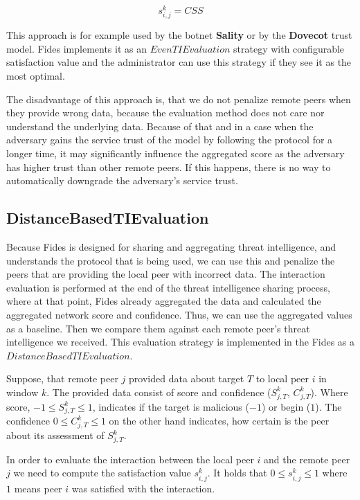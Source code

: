 \begin{equation}
s^{k}_{i, j} = CSS
\end{equation}

This approach is for example used by the botnet \textbf{Sality} or by the \textbf{Dovecot} trust model. Fides implements it as an $EvenTIEvaluation$ strategy with configurable satisfaction value and the administrator can use this strategy if they see it as the most optimal.

The disadvantage of this approach is, that we do not penalize remote peers when they provide wrong data, because the evaluation method does not care nor understand the underlying data.
Because of that and in a case when the adversary gains the service trust of the model by following the protocol for a longer time, it may significantly influence the aggregated score as the adversary has higher trust than other remote peers. If this happens, there is no way to automatically downgrade the adversary's service trust.

\subsection{DistanceBasedTIEvaluation}
\label{subsec:distance-based-eval}
Because Fides is designed for sharing and aggregating threat intelligence, and understands the protocol that is being used, we can use this and penalize the peers that are providing the local peer with incorrect data.
The interaction evaluation is performed at the end of the threat intelligence sharing process, where at that point, Fides already aggregated the data and calculated the aggregated network score and confidence. 
Thus, we can use the aggregated values as a baseline. Then we compare them against each remote peer's threat intelligence we received. This evaluation strategy is implemented in the Fides as a $DistanceBasedTIEvaluation$.

Suppose, that remote peer $j$ provided data about target $T$ to local peer $i$ in window $k$. The provided data consist of score and confidence ($S^{k}_{j, T}$, $C^{k}_{j, T}$). Where score,  $-1 \leq S^{k}_{j, T} \leq 1$, indicates if the target is malicious ($-1$) or begin ($1$). The confidence $0 \leq C^{k}_{j, T} \leq 1$ on the other hand indicates, how certain is the peer about its assessment of $S^{k}_{j, T}$.

In order to evaluate the interaction between the local peer $i$ and the remote peer $j$ we need to compute the satisfaction value $s^{k}_{i, j}$. 
It holds that  $0 \leq s^{k}_{i, j} \leq 1$ where $1$ means peer $i$ was satisfied with the interaction.

